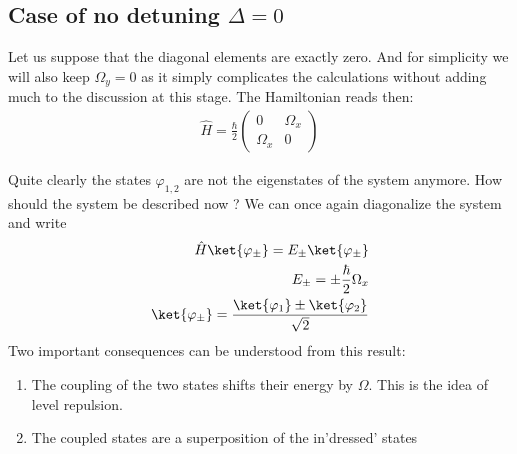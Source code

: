 \subsection{Case of no detuning $\Delta = 0$}

Let us suppose that the diagonal elements are exactly zero. And for simplicity we will also keep $\Omega_y =0$ as it simply complicates the calculations without adding much to the discussion at this stage. The Hamiltonian reads then:
\begin{align}
\hat{H} = \frac{\hbar}{2}\left( \begin{array}{cc} 0  & \Omega_x\\ \Omega_x &0 \end{array} \right)
\end{align}

Quite clearly the states $\varphi_{1,2}$ are not the eigenstates of the system anymore. How should the system be described now ? We can once again diagonalize the system and write
\begin{align}
\hat{H}\ket{\varphi_{\pm}} = E_{\pm}\ket{\varphi_\pm}\\
E_{\pm} = \pm\frac{\hbar}{2}\Omega_x\\
\ket{\varphi_\pm} = \frac{\ket{\varphi_1}\pm\ket{\varphi_2}}{\sqrt{2}}
\end{align}
Two important consequences can be understood from this result:
\begin{enumerate}
\item The coupling of the two states shifts their energy by $\Omega$. This is the idea of level repulsion.
\item The coupled states are a superposition of the in'dressed' states 
\end{enumerate}